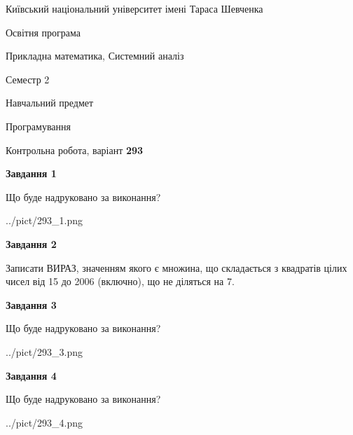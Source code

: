 \documentclass[12pt, ukrainian]{article}
\begin{document}
{{\begin {small}\par
{ \center  Київський національний університет імені Тараса Шевченка \par}
{\parbox {5 cm}{Освітня програма \hfill}{\parbox {8 cm}{Прикладна математика, Системний аналіз \hfill}}\parbox {5 cm}{\hfill Семестр 2}}\par
{\parbox {5 cm} {Навчальний предмет \hfill}\parbox {7 cm}{Програмування \hfill}\parbox {6cm}{\hfill}\par}\vspace{-7pt} \end{small}}{\center Контрольна робота, варіант  \No \textbf
{ 293 }\par}}
{
\begin {large}
{\begin {center}\textbf{Завдання 1}\end {center}}\par
Що буде надруковано за виконання?\par\par
\begin{center}
	{../pict/293_1.png}
\end{center}
\newpage

{\begin {center}\textbf{Завдання 2}\end {center}}\par
Записати ВИРАЗ, значенням якого є множина, що складається з квадратів цілих чисел від 15 до 2006 (включно), що не діляться на 7.\par
\newpage

{\begin {center}\textbf{Завдання 3}\end {center}}\par
Що буде надруковано за виконання?\par
\begin{center}
	{../pict/293_3.png}
\end{center}
\newpage

{\begin {center}\textbf{Завдання 4}\end {center}}\par
Що буде надруковано за виконання?\par
\begin{center}
	{../pict/293_4.png}
\end{center}
\newpage


\end{large}}
\end{document}
